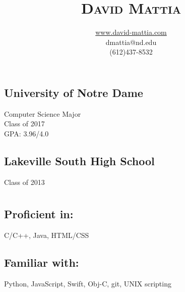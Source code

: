 \documentclass[10pt]{article}
\begin{document}

\title{\vspace{-10ex} %
	\color{red}\Huge\textsc{David Mattia} %
	\vspace{-1ex}} %
\author{\url{www.david-mattia.com}\\ 
	dmattia@nd.edu\\
	(612)437-8532 \vspace{-3ex}}
\date{} %
\maketitle

\noindent\makebox[\linewidth]{\rule{.9\paperwidth}{0.4pt}} %

\begin{minipage}[t]{0.35\textwidth}   %

	\section*{} 
		\subsection*{University of Notre Dame}
		{Computer Science Major\\
		 Class of 2017\\
		 GPA: 3.96/4.0}
		\subsection*{Lakeville South High School}
		{Class of 2013}

	\section*{}
		\subsection*{Proficient in:}
		{C/C++, Java, HTML/CSS}
		\subsection*{Familiar with:}
		{Python, JavaScript, Swift, Obj-C, git, UNIX scripting}

	\section*{}

\end{minipage}
\end{document}
